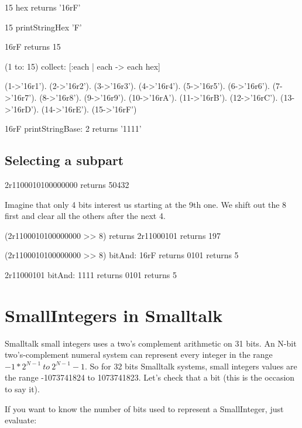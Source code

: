 \documentclass[a4paper,10pt,twoside]{book}
\begin{document}
\begin{code}
15 hex
	returns '16rF'
	
15 printStringHex 'F'

16rF
	returns 15
\end{code}


\begin{code}
(1 to: 15) collect: [:each | each -> each hex] 

{(1->'16r1'). (2->'16r2'). (3->'16r3'). (4->'16r4'). (5->'16r5'). (6->'16r6'). (7->'16r7'). (8->'16r8'). (9->'16r9'). (10->'16rA'). (11->'16rB'). (12->'16rC'). (13->'16rD'). (14->'16rE'). (15->'16rF')}
\end{code}


\begin{code}{}
16rF printStringBase: 2
	returns '1111'
\end{code}


\subsection*{Selecting a subpart}

\begin{code}{}
2r1100010100000000 
	returns 50432
\end{code}

Imagine that only 4 bits interest us starting at the 9th one.
We shift out the 8 first and clear all the others after the next 4.  

\begin{code}{}
(2r1100010100000000 >> 8)
	returns 2r11000101
	returns 197

(2r1100010100000000 >> 8) bitAnd: 16rF	
	returns 0101	
	returns 5
	
2r11000101 bitAnd: 1111
	returns 0101	
	returns 5
\end{code}


\section{SmallIntegers in Smalltalk}

Smalltalk small integers uses a two's complement arithmetic on 31 bits.  
An N-bit two's-complement numeral system can represent every integer in the range $-1 * 2^{N-1}\ to\ 2^{N-1}-1$. So for 32 bits Smalltalk systems, small integers values are the range -1073741824 to  1073741823. Let's check that a bit (this is the occasion to say it). 



If you want to know the number of bits used to represent a
SmallInteger, just evaluate:
\end{document}
